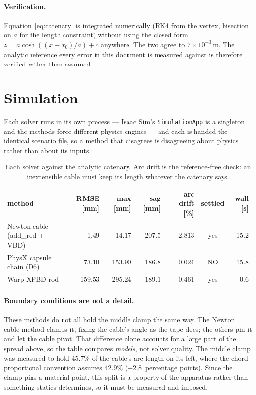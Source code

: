 \documentclass[11pt,a4paper]{article}
\begin{document}
\paragraph{Verification.} Equation~\eqref{eq:catenary} is integrated
numerically (RK4 from the vertex, bisection on $a$ for the length constraint)
without using the closed form $z = a\cosh((x-x_0)/a) + c$ anywhere. The two
agree to $7\times10^{-3}$\,\textmu m. The analytic reference every error in
this document is measured against is therefore verified rather than assumed.

\section{Simulation}

Each solver runs in its own process --- Isaac Sim's \texttt{SimulationApp} is
a singleton and the methods force different physics engines --- and each is
handed the identical scenario file, so a method that disagrees is disagreeing
about physics rather than about its inputs.

\begin{table}[htbp]
\centering\small
\begin{tabular}{lrrrrcr}
\toprule
method & RMSE [mm] & max [mm] & sag [mm] & arc drift [\%] & settled & wall [s] \\
\midrule
    Newton cable (add\_rod + VBD) & 1.49 & 14.17 & 207.5 & 2.813 & yes & 15.2 \\
    PhysX capsule chain (D6) & 73.10 & 153.90 & 186.8 & 0.024 & NO & 15.8 \\
    Warp XPBD rod & 159.53 & 295.24 & 189.1 & -0.461 & yes & 0.6 \\
\bottomrule
\end{tabular}
\caption{Each solver against the analytic catenary. Arc drift is the
reference-free check: an inextensible cable must keep its length whatever the
catenary says.}
\end{table}

\paragraph{Boundary conditions are not a detail.} These methods do not all
hold the middle clamp the same way. The Newton cable method clamps it, fixing
the cable's angle as the tape does; the others pin it and let the cable pivot.
That difference alone accounts for a large part of the spread above, so the
table compares \emph{models}, not solver quality. The middle clamp was measured to hold 45.7\% of the cable's arc length on its left, where the chord-proportional convention assumes 42.9\% (+2.8~percentage points). Since the clamp pins a material point, this split is a property of the apparatus rather than something statics determines, so it must be measured and imposed.
\end{document}
